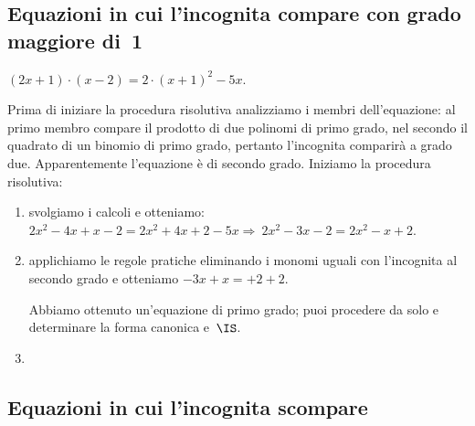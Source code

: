 
\subsection{Equazioni in cui l'incognita compare con grado maggiore di~1}

 \begin{esempio}

\((2x+1)\cdot (x-2)=2\cdot (x+1)^{2}-5x\).

Prima di iniziare la procedura risolutiva analizziamo i membri
dell'equazione: al primo membro compare il prodotto
di due polinomi di primo grado, nel secondo il quadrato di un binomio
di primo grado, pertanto l'incognita comparirà a grado due. Apparentemente
l'equazione è di secondo grado. Iniziamo la procedura
risolutiva:

\begin{enumerate}
 \item svolgiamo i calcoli e otteniamo:
\(2x^{2}-4x+x-2=2x^{2}+4x+2-5x\Rightarrow~2x^{2}-3x-2=2x^{2}-x+2.\)
 \item applichiamo le regole pratiche eliminando i monomi
uguali con l'incognita al secondo grado e otteniamo
\(-3x+x=+2+2\).

Abbiamo ottenuto un'equazione di primo grado; puoi
procedere da solo e determinare la forma canonica e~\(\IS\).
 \item \dotfill
\end{enumerate}

 \end{esempio}



\subsection{Equazioni in cui l'incognita scompare}

